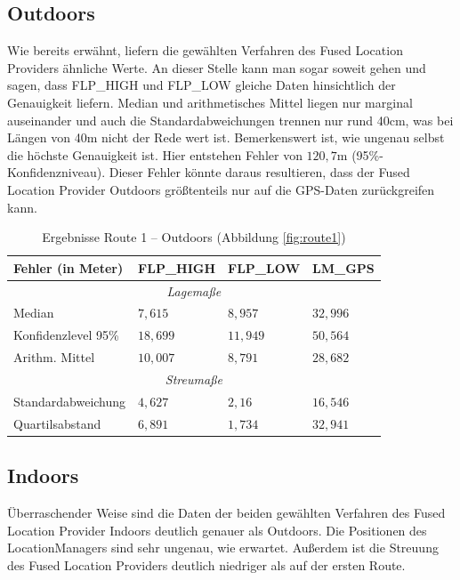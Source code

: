 \subsection{Outdoors}

Wie bereits erwähnt, liefern die gewählten Verfahren des Fused Location Providers ähnliche Werte. An dieser Stelle kann man sogar soweit gehen und sagen, dass FLP\_HIGH und FLP\_LOW gleiche Daten hinsichtlich der Genauigkeit liefern. Median und arithmetisches Mittel liegen nur marginal auseinander und auch die Standardabweichungen trennen nur rund 40cm, was bei Längen von 40m nicht der Rede wert ist. Bemerkenswert ist, wie ungenau selbst die höchste Genauigkeit ist. Hier entstehen Fehler von $120,7$m (95\%-Konfidenzniveau). Dieser Fehler könnte daraus resultieren, dass der Fused Location Provider Outdoors größtenteils nur auf die GPS-Daten zurückgreifen kann.

\renewcommand{\arraystretch}{1.2}
\begin{table}[h!]
	\centering
	\caption{Ergebnisse Route 1 -- Outdoors (Abbildung \ref{fig:route1})}
	\begin{tabular}{|l|l|l|l|}
	\hline
	Fehler (in Meter) & FLP\_HIGH & FLP\_LOW & LM\_GPS \\
	\hline
	\multicolumn{4}{|c|}{\textit{Lagemaße}}\\
	\hline
	Median & $7,615$ & $8,957$ & $32,996$ \\
	Konfidenzlevel 95\% & $18,699$ & $11,949$ & $50,564$ \\
	Arithm. Mittel & $10,007$ & $8,791$ & $28,682$ \\
	\hline
	\multicolumn{4}{|c|}{\textit{Streumaße}}\\
	\hline
	Standardabweichung & $4,627$ & $2,16$ & $16,546$ \\
	Quartilsabstand & $6,891$ & $1,734$ & $32,941$ \\
	\hline
	\end{tabular}
\end{table}

\subsection{Indoors}

Überraschender Weise sind die Daten der beiden gewählten Verfahren des Fused Location Provider Indoors deutlich genauer als Outdoors. Die Positionen des LocationManagers sind sehr ungenau, wie erwartet. Außerdem ist die Streuung des Fused Location Providers deutlich niedriger als auf der ersten Route.

